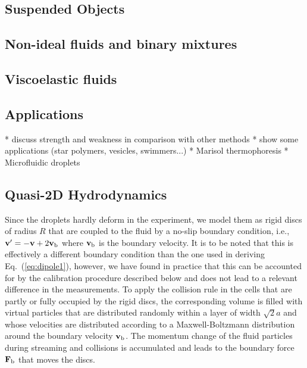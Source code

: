 \documentclass[8.5pt,twoside,twocolumn]{article}
\renewcommand{\vec}[1]{{\ensuremath{\mathchoice
                     {\mbox{\boldmath$\displaystyle\mathbf{#1}$}}
                     {\mbox{\boldmath$\textstyle\mathbf{#1}$}}
                     {\mbox{\boldmath$\scriptstyle\mathbf{#1}$}}
                     {\mbox{\boldmath$\scriptscriptstyle\mathbf{#1}$}}}}}%
\newcommand{\vvec}{\ensuremath{\vec{v}}}
\begin{document}
\subsection{Suspended Objects}
\subsection{Non-ideal fluids and binary mixtures}
\subsection{Viscoelastic fluids}
\subsection{Applications}

* discuss strength and weakness in comparison with other methods
* show some applications (star polymers, vesicles, swimmers...)
* Marisol thermophoresis
* Microfluidic droplets

\subsection{Quasi-2D Hydrodynamics}

Since the droplets hardly deform in the experiment, we model them as
rigid discs of radius $R$ that are coupled to the fluid by a no-slip
boundary condition, i.e., $\vvec' = -\vvec + 2\vvec_\text{b}$ where
$\vvec_\text{b}$ is the boundary velocity. It is to be noted that this
is effectively a different boundary condition than the one used in
deriving Eq.~(\ref{eq:dipole1}), however, we have found in practice
that this can be accounted for by the calibration procedure described
below and does not lead to a relevant difference in the
measurements. To apply the collision rule in the cells that are partly
or fully occupied by the rigid discs, the corresponding volume is
filled with virtual particles that are distributed randomly within a
layer of width $\sqrt{2}a$ and whose velocities are distributed
according to a Maxwell-Boltzmann distribution around the boundary
velocity $\vvec_\text{b}$.\cite{Goetze2007} The momentum change of the
fluid particles during streaming and collisions is accumulated and
leads to the boundary force $\vec{F}_\text{b}$ that moves the
discs.\cite{Goetze2011}
\end{document}
